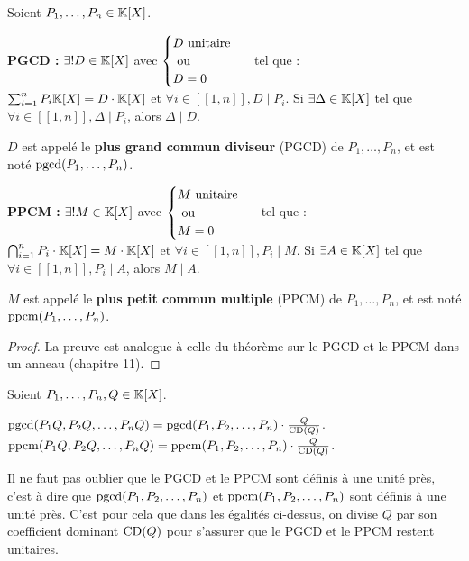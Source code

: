 \documentclass[12pt, a4paper]{report}
\begin{document}
\begin{theorem}
    Soient $P_1,\dots,P_n \in \mathbb{K}[X]$.
    \begin{outline}[enumerate]
        \1 \textbf{PGCD :}
        \2 $\exists ! D \in \mathbb{K}[X]$ avec $\begin{cases}D \text{ unitaire }\\\text{ ou }\\D= 0\end{cases}$ tel que :\\ $\sum_{i=1}^{n}P_i \mathbb{K}[X] = D\cdot\mathbb{K}[X]$ et $\forall i \in [\![1,n]\!], D \mid P_i$.
        \2 Si $\exists \Delta \in \mathbb{K}[X]$ tel que $\forall i \in [\![1,n]\!], \Delta \mid P_i$, alors $\Delta \mid D$.
        
        $D$ est appelé le \textbf{plus grand commun diviseur} (PGCD) de $P_1,\dots,P_n$, et est noté $\mathrm{pgcd}(P_1,\dots,P_n)$.

        \1 \textbf{PPCM :}
        \2 $\exists ! M \in \mathbb{K}[X]$ avec $\begin{cases}M \text{ unitaire }\\\text{ ou }\\M= 0\end{cases}$ tel que :\\ $\bigcap_{i=1}^{n} P_i \cdot \mathbb{K}[X] = M\cdot\mathbb{K}[X]$ et $\forall i \in [\![1,n]\!], P_i \mid M$.
        \2 Si $\exists A \in \mathbb{K}[X]$ tel que $\forall i \in [\![1,n]\!], P_i \mid A$, alors $M \mid A$.

        $M$ est appelé le \textbf{plus petit commun multiple} (PPCM) de $P_1,\dots,P_n$, et est noté $\mathrm{ppcm}(P_1,\dots,P_n)$.
    \end{outline}
\end{theorem}

\begin{proof}
    La preuve est analogue à celle du théorème sur le PGCD et le PPCM dans un anneau (chapitre 11).
\end{proof}

\begin{property}
    Soient $P_1, \dots , P_n, Q \in \mathbb{K}[X]$.
    \begin{outline}[enumerate]
        \1 $\mathrm{pgcd}(P_1Q, P_2Q, \dots, P_nQ) = \mathrm{pgcd}(P_1, P_2, \dots, P_n) \cdot \frac{Q}{\mathrm{CD}(Q)}$.
        \1 $\mathrm{ppcm}(P_1Q, P_2Q, \dots, P_nQ) = \mathrm{ppcm}(P_1, P_2, \dots, P_n) \cdot \frac{Q}{\mathrm{CD}(Q)}$.
    \end{outline}
\end{property}

\begin{attention}
    Il ne faut pas oublier que le PGCD et le PPCM sont définis à une unité près, c'est à dire que $\mathrm{pgcd}(P_1, P_2, \dots, P_n)$ et $\mathrm{ppcm}(P_1, P_2, \dots, P_n)$ sont définis à une unité près. C'est pour cela que dans les égalités ci-dessus, on divise $Q$ par son coefficient dominant $\mathrm{CD}(Q)$ pour s'assurer que le PGCD et le PPCM restent unitaires.
\end{attention}
\end{document}
